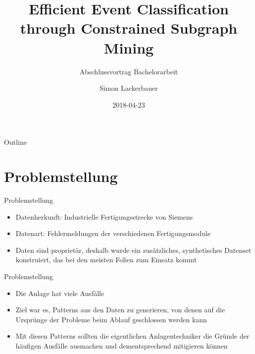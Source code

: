 \documentclass{beamer}
\title{Efficient Event Classification through Constrained Subgraph Mining}
\subtitle{Abschlussvortrag Bachelorarbeit}
\author{Simon Lackerbauer}
\institute[Ludwig-Maximilians-Universität München]
{
}
\date{2018-04-23}
\begin{document}
  
  \begin{frame}
    \titlepage
  \end{frame}
  
  \begin{frame}{Outline}
    \tableofcontents
  \end{frame}
  
  \section{Problemstellung}
  
  \begin{frame}{Problemstellung}{}
    \begin{itemize}
      \item Datenherkunft: Industrielle Fertigungsstrecke von Siemens
      \item Datenart: Fehlermeldungen der verschiedenen Fertigungsmodule
      \item Daten sind proprietär, deshalb wurde ein zusätzliches, synthetisches Datenset konstruiert, das bei den meisten Folien zum Einsatz kommt
    \end{itemize}
  \end{frame}

\begin{frame}{Problemstellung}
    \begin{itemize}
        \item Die Anlage hat viele Ausfälle
        \item Ziel war es, Patterns aus den Daten zu generieren, von denen auf die Ursprünge der Probleme beim Ablauf geschlossen werden kann
        \item Mit diesen Patterns sollten die eigentlichen Anlagentechniker die Gründe der häufigen Ausfälle ausmachen und dementsprechend mitigieren können
    \end{itemize}
\end{frame}
\end{document}
